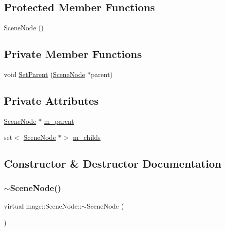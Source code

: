 \subsection*{Protected Member Functions}
\begin{DoxyCompactItemize}
\item 
\hyperlink{classmage_1_1_scene_node_a7c3db24cf811eba9a12b5a2989e7f27f}{Scene\+Node} ()
\end{DoxyCompactItemize}
\subsection*{Private Member Functions}
\begin{DoxyCompactItemize}
\item 
void \hyperlink{classmage_1_1_scene_node_a27d5219ff4c1f2b1c37899456af518ae}{Set\+Parent} (\hyperlink{classmage_1_1_scene_node}{Scene\+Node} $\ast$parent)
\end{DoxyCompactItemize}
\subsection*{Private Attributes}
\begin{DoxyCompactItemize}
\item 
\hyperlink{classmage_1_1_scene_node}{Scene\+Node} $\ast$ \hyperlink{classmage_1_1_scene_node_a507db45672f28f899f6c7b0f6a292202}{m\+\_\+parent}
\item 
set$<$ \hyperlink{classmage_1_1_scene_node}{Scene\+Node} $\ast$$>$ \hyperlink{classmage_1_1_scene_node_af3a11d9847c95d90e9dee2a2575fd92b}{m\+\_\+childs}
\end{DoxyCompactItemize}


\subsection{Constructor \& Destructor Documentation}
\hypertarget{classmage_1_1_scene_node_ad7ae54e25fb970772c0b0a6c5bac57ff}{}\label{classmage_1_1_scene_node_ad7ae54e25fb970772c0b0a6c5bac57ff} 
\subsubsection{\texorpdfstring{$\sim$\+Scene\+Node()}{~SceneNode()}}
{\footnotesize\ttfamily virtual mage\+::\+Scene\+Node\+::$\sim$\+Scene\+Node (\begin{DoxyParamCaption}{ }\end{DoxyParamCaption})\hspace{0.3cm}{\ttfamily [virtual]}}


